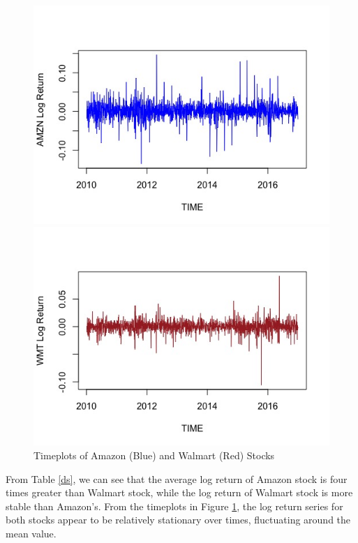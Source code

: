 \documentclass[paper=a4, fontsize=11pt]{article}
\begin{document}
\begin{figure}[!htbp]
\begin{minipage}[!htbp]{0.5\linewidth}
\centering
\includegraphics[scale = 0.45]{img/timeplot_AMZN}
\end{minipage}
\begin{minipage}[!htbp]{0.5\linewidth}
\centering
\includegraphics[scale = 0.45]{img/timeplot_WMT}
\end{minipage}
\caption{Timeplots of Amazon (Blue) and Walmart (Red) Stocks}
\label{tp}
\end{figure}

From Table \ref{ds}, we can see that the average log return of Amazon stock  is four times greater than Walmart stock, while the log return of Walmart stock is more stable than Amazon's. From the timeplots in Figure \ref{tp}, the log return series for both stocks appear to be relatively stationary over times, fluctuating around the mean value.
\end{document}
